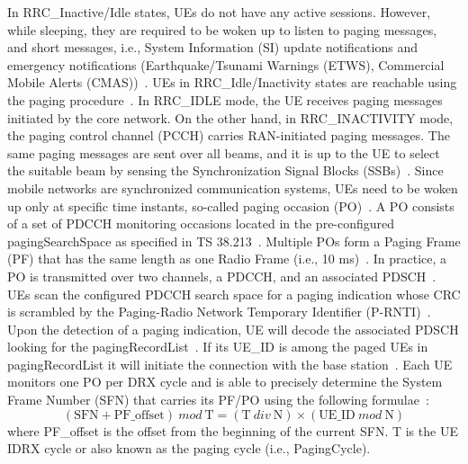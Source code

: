 \documentclass[]{IEEEtran}
\begin{document}
In RRC\_Inactive/Idle states, UEs do not have any active sessions.
However, while sleeping, they are required to be woken up to listen to paging messages, and short messages, i.e., System Information (SI) update notifications and emergency notifications (Earthquake/Tsunami Warnings (ETWS), Commercial Mobile Alerts (CMAS))~\cite{TS_38.321,awada2017radio}. 
UEs in RRC\_Idle/Inactivity states are reachable using the paging procedure~\cite{verma2019energy}.
    In RRC\_IDLE mode, the UE receives paging messages initiated by the core network.
On the other hand, in RRC\_INACTIVITY mode, the paging control channel (PCCH) carries RAN-initiated paging messages.
The same paging messages are sent over all beams, and it is up to the UE to select the suitable beam by sensing the Synchronization Signal Blocks (SSBs)~\cite{agiwal2022enhanced}.
Since mobile networks are synchronized communication systems, UEs need to be woken up only at specific time instants, so-called paging occasion (PO)~\cite{lauridsen2021study}. 
A PO consists of a set of PDCCH monitoring occasions located in the pre-configured pagingSearchSpace as specified in TS 38.213~\cite{3gpp_nr_2022-1_38.213}. 
Multiple POs form a Paging Frame (PF) that has the same length as one Radio Frame (i.e., 10 ms)~\cite{li_radio_2022}. 
In practice, a PO is transmitted over two channels, a PDCCH, and an associated PDSCH~\cite{esswie_power_2022}. 
UEs scan the configured PDCCH search space for a paging indication whose CRC is scrambled by the Paging-Radio Network Temporary Identifier (P-RNTI)~\cite{TS_38.321}. 
Upon the detection of a paging indication, UE will decode the associated PDSCH looking for the pagingRecordList~\cite{3gpp_nr_2022-10_38.304}.
If its UE\_ID is among the paged UEs in pagingRecordList it will initiate the connection with the base station~\cite{ramazanali2017modeling}.
Each UE monitors one PO per DRX cycle and is able to precisely determine the System Frame Number (SFN) that carries its PF/PO using the following formulae~\cite{3gpp_nr_2022-10_38.304}:
\begin{equation}
(\textrm{SFN} + \textrm{PF}\_{\textrm{offset}})~mod~\textrm{T} = (\textrm{T}~div~\textrm{N})\times(\textrm{UE}\_{\textrm{ID}}~mod~\textrm{N})
\label{equ:spectral-efficiency}
\end{equation}
where PF\_offset is the offset from the beginning of the current SFN.
T is the UE IDRX cycle or also known as the paging cycle (i.e., PagingCycle).
\end{document}
